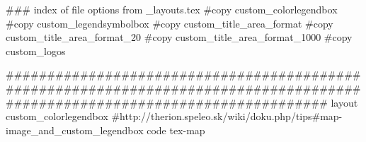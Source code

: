 ### index of file options from _layouts.tex
  #copy custom_colorlegendbox
  #copy custom_legendsymbolbox
  #copy custom_title_area_format
  #copy custom_title_area_format_20
  #copy custom_title_area_format_1000
  #copy custom_logos

#############################################################################################################################
layout custom_colorlegendbox
  #http://therion.speleo.sk/wiki/doku.php/tips#map-image_and_custom_legendbox
  code tex-map





        \def\colorlegendbox#1{%

	  \setbox\xxx=\hbox to 36bp{%
	     \PL{q #1 0 0 36 24 re f Q}\hfil}%
	     \ht\xxx=25bp%
	     \dp\xxx=0bp%
	     \immediate\pdfxform resources{/ExtGState \the\resid\space 0 R \colorres}\xxx%

        }


	\def\colorlegendboxduf#1{%
	  \setbox\zzztmpboxa=\hbox{\pdfxform#1}%


	  \zzztmpdimen=5pt                           %
	     \box\zzztmpboxa
		\raise10cm %
	}

